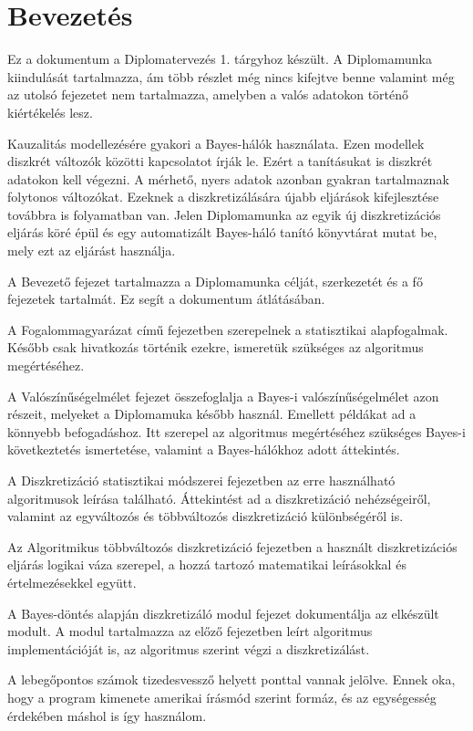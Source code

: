 \chapter*{Bevezetés}

Ez a dokumentum a Diplomatervezés 1. tárgyhoz készült. A Diplomamunka kiindulását tartalmazza, ám több részlet még nincs kifejtve benne valamint még az utolsó fejezetet nem tartalmazza, amelyben a valós adatokon történő kiértékelés lesz.

Kauzalitás modellezésére gyakori a Bayes-hálók használata. Ezen modellek diszkrét változók közötti kapcsolatot írják le. Ezért a tanításukat is diszkrét adatokon kell végezni. A mérhető, nyers adatok azonban gyakran tartalmaznak folytonos változókat. Ezeknek a diszkretizálására újabb eljárások kifejlesztése továbbra is folyamatban van. Jelen Diplomamunka az egyik új diszkretizációs eljárás köré épül és egy automatizált Bayes-háló tanító könyvtárat mutat be, mely ezt az eljárást használja.

A Bevezető fejezet tartalmazza a Diplomamunka célját, szerkezetét és a fő fejezetek tartalmát. Ez segít a dokumentum átlátásában.

A Fogalommagyarázat című fejezetben szerepelnek a statisztikai alapfogalmak. Később csak hivatkozás történik ezekre, ismeretük szükséges az algoritmus megértéséhez.

A Valószínűségelmélet fejezet összefoglalja a Bayes-i valószínűségelmélet azon részeit, melyeket a Diplomamuka később használ. Emellett példákat ad a könnyebb befogadáshoz. Itt szerepel az algoritmus megértéséhez szükséges Bayes-i következtetés ismertetése, valamint a Bayes-hálókhoz adott áttekintés.

A Diszkretizáció statisztikai módszerei fejezetben az erre használható algoritmusok leírása található. Áttekintést ad a diszkretizáció nehézségeiről, valamint az egyváltozós és többváltozós diszkretizáció különbségéről is.

Az Algoritmikus többváltozós diszkretizáció fejezetben a használt diszkretizációs eljárás logikai váza szerepel, a hozzá tartozó matematikai leírásokkal és értelmezésekkel együtt.

A Bayes-döntés alapján diszkretizáló modul fejezet dokumentálja az elkészült modult. A modul tartalmazza az előző fejezetben leírt algoritmus implementációját is, az algoritmus szerint végzi a diszkretizálást.

A lebegőpontos számok tizedesvessző helyett ponttal vannak jelölve. Ennek oka, hogy a program kimenete amerikai írásmód szerint formáz, és az egységesség érdekében máshol is így használom.